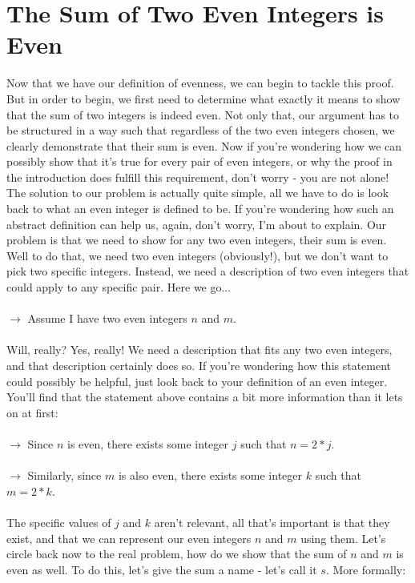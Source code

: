\documentclass[a4paper,12pt]{article}
\begin{document}
\section{The Sum of Two Even Integers is Even}
Now that we have our definition of evenness, we can begin to tackle this proof. But in order to begin, we first need to determine what exactly it means to show that the sum of two integers is indeed even. Not only that, our argument has to be structured in a way such that regardless of the two even integers chosen, we clearly demonstrate that their sum is even. Now if you're wondering how we can possibly show that it's true for every pair of even integers, or why the proof in the introduction does fulfill this requirement, don't worry - you are not alone! The solution to our problem is actually quite simple, all we have to do is look back to what an even integer is defined to be. If you're wondering how such an abstract definition can help us, again, don't worry, I'm about to explain. Our problem is that we need to show for any two even integers, their sum is even. Well to do that, we need two even integers (obviously!), but we don't want to pick two specific integers. Instead, we need a description of two even integers that could apply to any specific pair. Here we go...\\
\\
$\rightarrow$ Assume I have two even integers $n$ and $m$. \\
\\
Will, really? Yes, really! We need a description that fits any two even integers, and that description certainly does so. If you're wondering how this statement could possibly be helpful, just look back to your definition of an even integer. You'll find that the statement above contains a bit more information than it lets on at first: \\
\\
$\rightarrow$ Since $n$ is even, there exists some integer $j$ such that $n = 2*j$. \\
\\
$\rightarrow$ Similarly, since $m$ is also even, there exists some integer $k$ such that $m = 2*k$. \\
\\
The specific values of $j$ and $k$ aren't relevant, all that's important is that they exist, and that we can represent our even integers $n$ and $m$ using them. Let's circle back now to the real problem, how do we show that the sum of $n$ and $m$ is even as well. To do this, let's give the sum a name - let's call it $s$. More formally:\\ 
\end{document}
